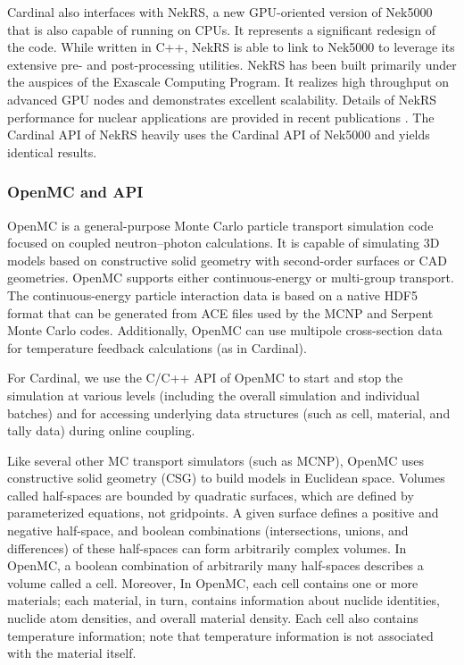 Cardinal also interfaces with NekRS, a new GPU-oriented version of Nek5000
that is also capable of running on CPUs. It represents a significant redesign
of the code.  While written in C++, NekRS is able to link to Nek5000 to
leverage its extensive pre- and post-processing utilities.  NekRS has been
built primarily under the auspices of the Exascale Computing Program. It
realizes high throughput on advanced GPU nodes and demonstrates excellent
scalability.  Details of NekRS performance for nuclear applications are
provided in recent publications \cite{merzari2020toward}. The Cardinal API of
NekRS heavily uses the Cardinal API of Nek5000 and yields identical results.

\subsubsection{OpenMC and API}

OpenMC \cite{romano2015openmc} is a general-purpose Monte Carlo particle transport simulation code focused on coupled neutron--photon calculations. It is
capable of simulating 3D models based on constructive solid geometry with second-order surfaces or CAD geometries. OpenMC
supports either continuous-energy or multi-group transport. The continuous-energy particle interaction data
is based on a native HDF5 format that can be generated from ACE files used by the MCNP and Serpent
Monte Carlo codes. Additionally, OpenMC can use multipole cross-section data for temperature feedback
calculations (as in Cardinal).

For Cardinal, we use the C/C++ API of OpenMC to start and stop the simulation at various levels (including the overall
simulation and individual batches) and for accessing underlying data structures (such as cell, material, and
tally data) during online coupling.

Like several other MC transport simulators (such as MCNP), OpenMC uses constructive solid geometry (CSG) to build models in Euclidean space.
Volumes called half-spaces are bounded by quadratic surfaces, which are defined by parameterized equations, not gridpoints. A given surface defines a positive and negative half-space, and boolean combinations (intersections, unions, and differences) of these half-spaces can form arbitrarily complex volumes. In OpenMC, a boolean combination of arbitrarily many half-spaces describes a volume called a cell. Moreover, In OpenMC, each cell contains one or more materials; each material, in turn, contains information about nuclide identities, nuclide atom densities, and overall material density. Each cell also contains temperature information; note that temperature information is not associated with the material itself.

